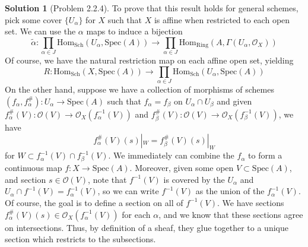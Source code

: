 \documentclass[aps,pra,showpacs,notitlepage,onecolumn,superscriptaddress,nofootinbib]{revtex4-1}
\theoremstyle{definition}
\newtheorem{solution}{Solution}[section]
\begin{document}
\begin{solution}[Problem 2.2.4]
  To prove that this result holds for general schemes, pick some cover $\{U_{\alpha}\}$ for $X$ such that $X$ is affine when restricted to each open set. We can use the $\alpha$ maps to induce a bijection
  \begin{equation}
    \widetilde{\alpha} : \displaystyle\prod_{\alpha \in J} \text{Hom}_{\text{Sch}}(U_{\alpha}, \text{Spec}(A)) \rightarrow \displaystyle\prod_{\alpha \in J} \text{Hom}_{\text{Ring}}(A, \Gamma(U_{\alpha}, \mathcal{O}_X))
    \end{equation}
  Of course, we have the natural restriction map on each affine open set, yielding
  \begin{equation}
  R : \text{Hom}_{\text{Sch}}(X, \text{Spec}(A)) \rightarrow  \displaystyle\prod_{\alpha \in J} \text{Hom}_{\text{Sch}}(U_{\alpha}, \text{Spec}(A))
  \end{equation}
  On the other hand, suppose we have a collection of morphisms of schemes $(f_{\alpha}, f_{\alpha}^{\#}) : U_{\alpha} \rightarrow \text{Spec}(A)$ such that $f_{\alpha} = f_{\beta}$ on $U_{\alpha} \cap U_{\beta}$ and
  given $f_{\alpha}^{\#}(V) : \mathcal{O}(V) \rightarrow \mathcal{O}_X(f_{\alpha}^{-1}(V))$ and $f_{\beta}^{\#}(V) : \mathcal{O}(V) \rightarrow \mathcal{O}_X(f_{\beta}^{-1}(V))$, we have
  \begin{equation}
    f_{\alpha}^{\#}(V)(s)|_{W} = f_{\beta}^{\#}(V)(s)|_{W}
    \end{equation}
  for $W \subset f_{\alpha}^{-1}(V) \cap f_{\beta}^{-1}(V)$. We immediately can combine the $f_{\alpha}$ to form a continuous map $f : X \rightarrow \text{Spec}(A)$. Moreover, given some open $V \subset \text{Spec}(A)$, and
  section $s \in \mathcal{O}(V)$, note that $f^{-1}(V)$ is covered by the $U_{\alpha}$ and $U_{\alpha} \cap f^{-1}(V) = f_{\alpha}^{-1}(V)$, so we can write $f^{-1}(V)$ as the union of the $f_{\alpha}^{-1}(V)$. Of course,
  the goal is to define a section on all of $f^{-1}(V)$. We have sections $f_{\alpha}^{\#}(V)(s) \in \mathcal{O}_X(f_{\alpha}^{-1}(V))$ for each $\alpha$, and we know that these sections agree on intersections.
  Thus, by definition of a sheaf, they glue together to a unique section which restricts to the subsections.


\end{solution}
\end{document}
